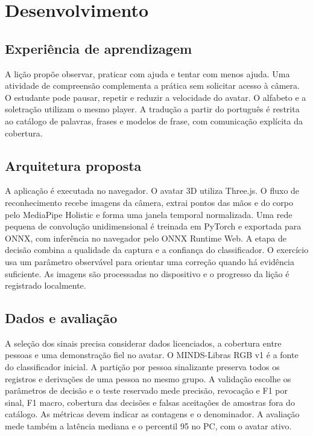 \documentclass[12pt,a4paper]{article}
\begin{document}
\section{Desenvolvimento}

\subsection{Experiência de aprendizagem}

A lição propõe observar, praticar com ajuda e tentar com menos ajuda. Uma atividade de compreensão complementa a prática sem solicitar acesso à câmera. O estudante pode pausar, repetir e reduzir a velocidade do avatar. O alfabeto e a soletração utilizam o mesmo player. A tradução a partir do português é restrita ao catálogo de palavras, frases e modelos de frase, com comunicação explícita da cobertura.

\subsection{Arquitetura proposta}

A aplicação é executada no navegador. O avatar 3D utiliza Three.js. O fluxo de reconhecimento recebe imagens da câmera, extrai pontos das mãos e do corpo pelo MediaPipe Holistic e forma uma janela temporal normalizada. Uma rede pequena de convolução unidimensional é treinada em PyTorch e exportada para ONNX, com inferência no navegador pelo ONNX Runtime Web. A etapa de decisão combina a qualidade da captura e a confiança do classificador. O exercício usa um parâmetro observável para orientar uma correção quando há evidência suficiente. As imagens são processadas no dispositivo e o progresso da lição é registrado localmente.

\subsection{Dados e avaliação}

A seleção dos sinais precisa considerar dados licenciados, a cobertura entre pessoas e uma demonstração fiel no avatar. O MINDS-Libras RGB v1 é a fonte do classificador inicial. A partição por pessoa sinalizante preserva todos os registros e derivações de uma pessoa no mesmo grupo. A validação escolhe os parâmetros de decisão e o teste reservado mede precisão, revocação e F1 por sinal, F1 macro, cobertura das decisões e falsas aceitações de amostras fora do catálogo. As métricas devem indicar as contagens e o denominador. A avaliação mede também a latência mediana e o percentil 95 no PC, com o avatar ativo.
\end{document}
